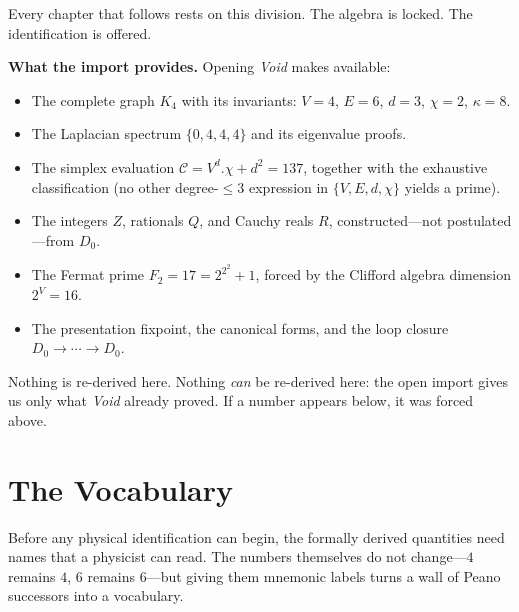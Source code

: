 \documentclass[11pt,a4paper]{book}
\def\cdot{.}%
\def\mathbb#1{#1}%
\def\texttt#1{#1}%
\newcommand{\VoidRef}[2]{\textit{#2} (in \textit{Void})}
\begin{document}
Every chapter that follows rests on this division. The algebra is locked. The identification is offered.

\medskip

\noindent\textbf{What the import provides.} Opening \textit{Void} makes available:

\begin{itemize}
\item The complete graph $K_4$ with its invariants: $V = 4$, $E = 6$, $d = 3$, $\chi = 2$, $\kappa = 8$.

\item The Laplacian spectrum $\{0,4,4,4\}$ and its eigenvalue proofs.

\item The simplex evaluation $\mathcal{C} = V^d \cdot \chi + d^2 = 137$, together with the exhaustive classification (no other degree-$\le 3$ expression in $\{V, E, d, \chi\}$ yields a prime).%

\item The integers $\mathbb{Z}$, rationals $\mathbb{Q}$, and Cauchy reals $\mathbb{R}$, constructed---not postulated---from $D_0$.

\item The Fermat prime $F_2 = 17 = 2^{2^2} + 1$, forced by the Clifford algebra dimension $2^V = 16$.

\item The presentation fixpoint, the canonical forms, and the loop closure $D_0 \to \cdots \to D_0$.
\end{itemize}

Nothing is re-derived here. Nothing \emph{can} be re-derived here: the \texttt{open import} gives us only what \textit{Void} already proved. If a number appears below, it was forced above.

\chapter{The Vocabulary}
\label{ch:the-vocabulary}

Before any physical identification can begin, the formally derived quantities need names that a physicist can read. The numbers themselves do not change---$4$ remains $4$, $6$ remains $6$---but giving them mnemonic labels turns a wall of Peano successors into a vocabulary.
\end{document}
